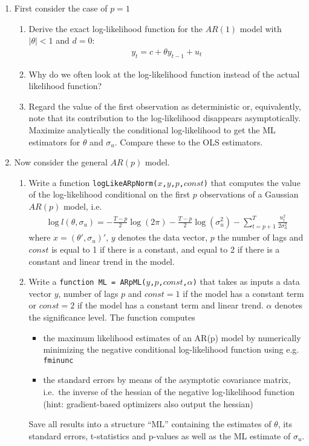 \begin{enumerate}
\item First consider the case of \(p=1\)
\begin{enumerate}
  \item Derive the exact log-likelihood function for the \(AR(1)\) model with \(|\theta|<1\) and \(d=0\):
  \begin{align*}
  y_t = c + \theta y_{t-1} + u_t
  \end{align*}
  \item Why do we often look at the log-likelihood function instead of the actual likelihood function?
  \item Regard the value of the first observation as deterministic or, equivalently,
    note that its contribution to the log-likelihood disappears asymptotically.
    Maximize analytically the conditional log-likelihood to get the ML estimators for \(\theta\) and \(\sigma_u\).
    Compare these to the OLS estimators.
\end{enumerate}
\item Now consider the general \(AR(p)\) model.
 	\begin{enumerate}
    \item Write a function \texttt{logLikeARpNorm(\(x\),\(y\),\(p\),\(const\))}
    that computes the value of the log-likelihood
    conditional on the first \(p\) observations of a Gaussian \(AR(p)\) model, i.e.
    \begin{align*}
    \log l(\theta,\sigma_u)= -\frac{T-p}{2}\log(2\pi)-\frac{T-p}{2}\log(\sigma_u^2)-\sum_{t=p+1}^{T}\frac{u_t^2}{2\sigma_u^2}
    \end{align*}
    where \(x=(\theta',\sigma_u)'\), \(y\) denotes the data vector,
    \(p\) the number of lags and \(const\) is equal to 1 if there is a constant,
    and equal to 2 if there is a constant and linear trend in the model.
    \item Write a \texttt{function ML = ARpML(\(y\),\(p\),\(const\),\( \alpha \))}
    that takes as inputs a data vector \(y\), number of lags \(p\)
    and \(const=1\) if the model has a constant term
    or \(const=2\) if the model has a constant term and linear trend.
    \(\alpha\) denotes the significance level.
    The function computes 
    \begin{itemize}
      \item the maximum likelihood estimates of an AR(p) model by numerically minimizing the negative conditional log-likelihood function using e.g. \texttt{fminunc}
      \item the standard errors by means of the asymptotic covariance matrix, i.e.\ the inverse of the hessian of the negative log-likelihood function
      (hint: gradient-based optimizers also output the hessian)
    \end{itemize}
    Save all results into a structure \enquote{ML} containing the estimates of \(\theta\),
    its standard errors, t-statistics and p-values as well as the ML estimate of \(\sigma_u\).
    

\end{enumerate}
\end{enumerate}
